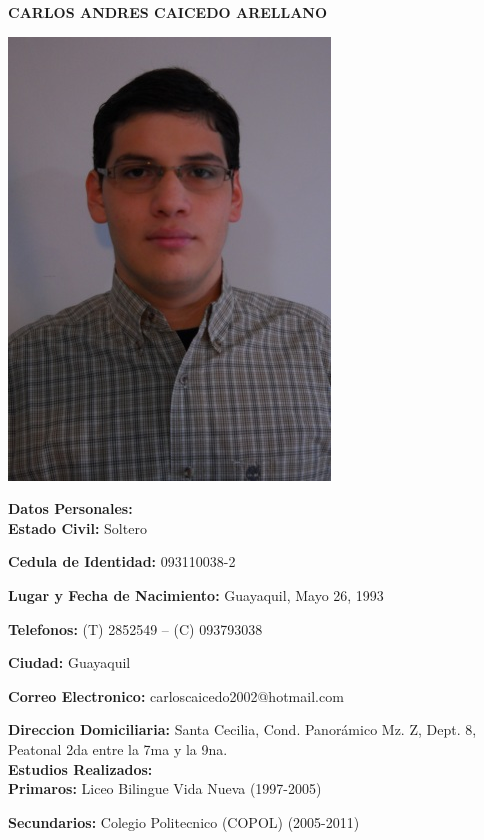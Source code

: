 \documentclass{article}
\begin{document}
\begin{center}
{\LARGE\textbf{CARLOS ANDRES CAICEDO ARELLANO}}\\
\end{center}

\begin{center}
\includegraphics{myimage.png}\\
\end{center}

{\large\textbf{Datos Personales:}}\\

\textbf{Estado Civil:} Soltero

\textbf{Cedula de Identidad:} 093110038-2

\textbf{Lugar y Fecha de Nacimiento:} Guayaquil, Mayo 26, 1993

\textbf{Telefonos:} (T) 2852549 – (C) 093793038

\textbf{Ciudad:} Guayaquil

\textbf{Correo Electronico:} carloscaicedo2002@hotmail.com

\textbf{Direccion Domiciliaria:} Santa Cecilia, Cond. Panorámico Mz. Z, Dept. 8, Peatonal 2da entre la 7ma y la 9na.\\

{\large\textbf{Estudios Realizados:}}\\

\textbf{Primaros:} Liceo Bilingue Vida Nueva (1997-2005)

\textbf{Secundarios:} Colegio Politecnico (COPOL) (2005-2011)
\end{document}
